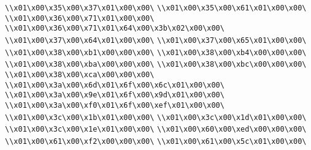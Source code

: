 \verb|\\x01\x00\x35\x00\x37\x01\x00\x00\|\newline
\verb|\\x01\x00\x35\x00\x61\x01\x00\x00\|\newline
\verb|\\x01\x00\x36\x00\x71\x01\x00\x00\|\newline
\verb|\\x01\x00\x36\x00\x71\x01\x64\x00\x3b\x02\x00\x00\|\newline
\verb|\\x01\x00\x37\x00\x64\x01\x00\x00\|\newline
\verb|\\x01\x00\x37\x00\x65\x01\x00\x00\|\newline
\verb|\\x01\x00\x38\x00\xb1\x00\x00\x00\|\newline
\verb|\\x01\x00\x38\x00\xb4\x00\x00\x00\|\newline
\verb|\\x01\x00\x38\x00\xba\x00\x00\x00\|\newline
\verb|\\x01\x00\x38\x00\xbc\x00\x00\x00\|\newline
\verb|\\x01\x00\x38\x00\xca\x00\x00\x00\|\newline
\verb|\\x01\x00\x3a\x00\x6d\x01\x6f\x00\x6c\x01\x00\x00\|\newline
\verb|\\x01\x00\x3a\x00\x9e\x01\x6f\x00\x9d\x01\x00\x00\|\newline
\verb|\\x01\x00\x3a\x00\xf0\x01\x6f\x00\xef\x01\x00\x00\|\newline
\verb|\\x01\x00\x3c\x00\x1b\x01\x00\x00\|\newline
\verb|\\x01\x00\x3c\x00\x1d\x01\x00\x00\|\newline
\verb|\\x01\x00\x3c\x00\x1e\x01\x00\x00\|\newline
\verb|\\x01\x00\x60\x00\xed\x00\x00\x00\|\newline
\verb|\\x01\x00\x61\x00\xf2\x00\x00\x00\|\newline
\verb|\\x01\x00\x61\x00\x5c\x01\x00\x00\|\newline
